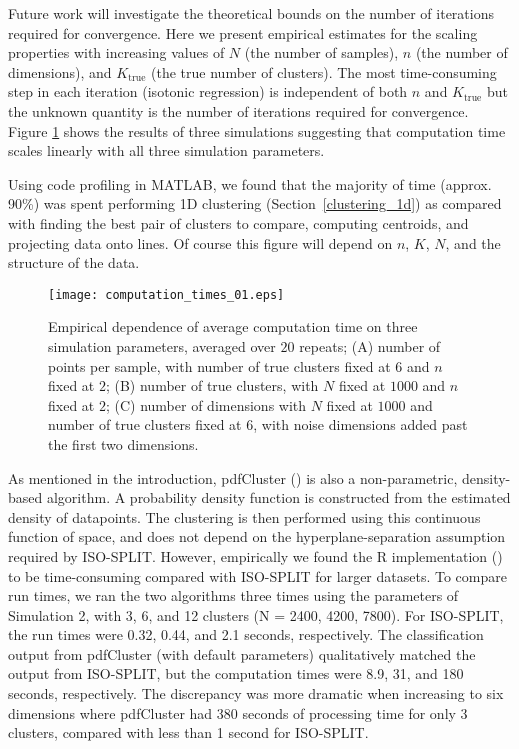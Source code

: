 \documentclass[10pt]{article}
\begin{document}
Future work will investigate the theoretical bounds on the number of iterations required for convergence. Here we present empirical estimates for the scaling properties with increasing values of $N$ (the number of samples), $n$ (the number of dimensions), and $K_\text{true}$ (the true number of clusters). The most time-consuming step in each iteration (isotonic regression) is independent of both $n$ and $K_\text{true}$ but the unknown quantity is the number of iterations required for convergence. Figure \ref{fig:computation_times_01} shows the results of three simulations suggesting that computation time scales linearly with all three simulation parameters.

Using code profiling in MATLAB, we found that the majority of time (approx. 90\%) was spent performing 1D clustering (Section~\ref{clustering_1d}) as compared with finding the best pair of clusters to compare, computing centroids, and projecting data onto lines. Of course this figure will depend on $n$, $K$, $N$, and the structure of the data.

\begin{figure}
\begin{center}
\texttt{[image: computation\_times\_01.eps]}
\end{center}
\caption{
Empirical dependence of average computation time on three simulation parameters, averaged over $20$ repeats; (A) number of points per sample, with number of true clusters fixed at $6$ and $n$ fixed at $2$; (B) number of true clusters, with $N$ fixed at $1000$ and $n$ fixed at $2$; (C) number of dimensions with $N$ fixed at $1000$ and number of true clusters fixed at $6$, with noise dimensions added past the first two dimensions.
}
\label{fig:computation_times_01}
\end{figure}

As mentioned in the introduction, pdfCluster (\cite{pdfcluster}) is also a non-parametric, density-based algorithm. A probability density function is constructed from the estimated density of datapoints. The clustering is then performed using this continuous function of space, and does not depend on the hyperplane-separation assumption required by ISO-SPLIT. However, empirically we found the R implementation (\cite{pdfclusterR}) to be time-consuming compared with ISO-SPLIT for larger datasets. To compare run times, we ran the two algorithms three times using the parameters of Simulation 2, with 3, 6, and 12 clusters (N = 2400, 4200, 7800). For ISO-SPLIT, the run times were 0.32, 0.44, and 2.1 seconds, respectively. The classification output from pdfCluster (with default parameters) qualitatively matched the output from ISO-SPLIT, but the computation times were 8.9, 31, and 180 seconds, respectively. The discrepancy was more dramatic when increasing to six dimensions where pdfCluster had 380 seconds of processing time for only 3 clusters, compared with less than 1 second for ISO-SPLIT.
\end{document}
